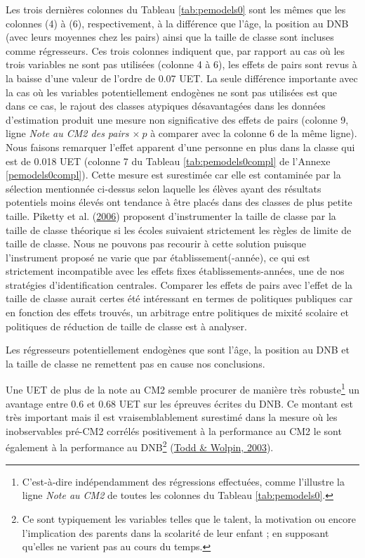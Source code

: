 \documentclass[
]{book}
\begin{document}
\quad Les trois dernières colonnes du Tableau \ref{tab:pemodels0} sont les mêmes que les colonnes (4) à (6), respectivement, à la différence que l'âge, la position au DNB (avec leurs moyennes chez les pairs) ainsi que la taille de classe sont incluses comme régresseurs. Ces trois colonnes indiquent que, par rapport au cas où les trois variables ne sont pas utilisées (colonne 4 à 6), les effets de pairs sont revus à la baisse d'une valeur de l'ordre de 0.07 UET. La seule différence importante avec la cas où les variables potentiellement endogènes ne sont pas utilisées est que dans ce cas, le rajout des classes atypiques désavantagées dans les données d'estimation produit une mesure non significative des effets de pairs (colonne 9, ligne \emph{Note au CM2 des pairs \(\times \ p\)} à comparer avec la colonne 6 de la même ligne).\\
Nous faisons remarquer l'effet apparent d'une personne en plus dans la classe qui est de 0.018 UET (colonne 7 du Tableau \ref{tab:pemodels0compl} de l'Annexe \ref{pemodels0compl}). Cette mesure est surestimée car elle est contaminée par la sélection mentionnée ci-dessus selon laquelle les élèves ayant des résultats potentiels moins élevés ont tendance à être placés dans des classes de plus petite taille. Piketty et al. (\protect\hyperlink{ref-PIK:VAL:06}{2006}) proposent d'instrumenter la taille de classe par la taille de classe théorique si les écoles suivaient strictement les règles de limite de taille de classe. Nous ne pouvons pas recourir à cette solution puisque l'instrument proposé ne varie que par établissement(-année), ce qui est strictement incompatible avec les effets fixes établissements-années, une de nos stratégies d'identification centrales. Comparer les effets de pairs avec l'effet de la taille de classe aurait certes été intéressant en termes de politiques publiques car en fonction des effets trouvés, un arbitrage entre politiques de mixité scolaire et politiques de réduction de taille de classe est à analyser.

\quad Les régresseurs potentiellement endogènes que sont l'âge, la position au DNB et la taille de classe ne remettent pas en cause nos conclusions.

\quad Une UET de plus de la note au CM2 semble procurer de manière très robuste\footnote{C'est-à-dire indépendamment des régressions effectuées, comme l'illustre la ligne \emph{Note au CM2} de toutes les colonnes du Tableau \ref{tab:pemodels0}.} un avantage entre 0.6 et 0.68 UET sur les épreuves écrites du DNB. Ce montant est très important mais il est vraisemblablement surestimé dans la mesure où les inobservables pré-CM2 corrélés positivement à la performance au CM2 le sont également à la performance au DNB\footnote{Ce sont typiquement les variables telles que le talent, la motivation ou encore l'implication des parents dans la scolarité de leur enfant ; en supposant qu'elles ne varient pas au cours du temps.} (\protect\hyperlink{ref-TOD:WOL:03}{Todd \& Wolpin, 2003}).
\end{document}
